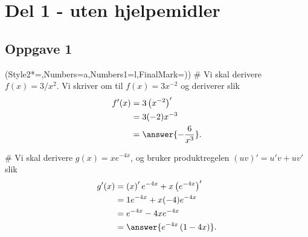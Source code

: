 


\newcommand{\fagkode}{S2}
\newcommand{\semesteraar}{våren 2014}
\newcommand{\forfatter}{Tommy O.}
\newcommand{\dokumenttittel}{Løsningsforslag -- Eksamen \fagkode, \semesteraar}


\newcommand{\logonavn}{figs/metis_akademiet_privatistskole_doclogo.png}




\section*{Del 1 - uten hjelpemidler}
\subsection*{Oppgave 1}
\begin{easylist}[enumerate]
\ListProperties(Style2*=,Numbers=a,Numbers1=l,FinalMark={)})
# Vi skal derivere $f(x) = 3/x^2$. 
Vi skriver om til $f(x) = 3x^{-2}$ og deriverer slik
\begin{align*}
	f'(x) &= 3 \left(x^{-2}\right)' \\
	      & = 3 (-2)x^{-3} \\
	      & = \answer{-\frac{6}{x^3}}.
\end{align*}


# Vi skal derivere $g(x) = xe^{-4x}$, og bruker produktregelen
$(uv)' = u'v + uv'$ slik
\begin{align*}
	g'(x) &= \left(x \right)' e^{-4x} +x \left( e^{-4x} \right)' \\
	& = 1 e^{-4x} + x (-4) e^{-4x}  \\
	& = e^{-4x} -4x e^{-4x}  \\
	& =  \answer{e^{-4x} \left( 1 - 4x\right) }.
\end{align*}
\end{easylist}

